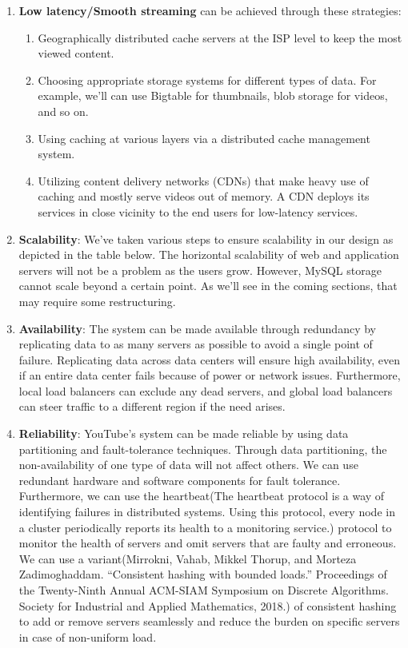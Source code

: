 \begin{enumerate}
\item
\protect{}\label{F2XITvDm3UDQ8Ldcz-ayd}
\textbf{Low latency/Smooth streaming} can be achieved through these strategies:

\begin{enumerate}
\item
Geographically distributed cache servers at the ISP level to keep the most viewed content.
\item
Choosing appropriate storage systems for different types of data. For example, we'll can use Bigtable for thumbnails, blob storage for videos, and so on.
\item
Using caching at various layers via a distributed cache management system.
\item
Utilizing content delivery networks (CDNs) that make heavy use of caching and mostly serve videos out of memory. A CDN deploys its services in close vicinity to the end users for low-latency services.
\end{enumerate}
\item
\protect{}\label{sZtgCym4kSNPRUXife1fA}
\textbf{Scalability}: We've taken various steps to ensure scalability in our design as depicted in the table below. The horizontal scalability of web and application servers will not be a problem as the users grow. However, MySQL storage cannot scale beyond a certain point. As we'll see in the coming sections, that may require some restructuring.
\item
\protect{}\label{LhqJlMDDBff7hNp1W108Z}
\textbf{Availability}: The system can be made available through redundancy by replicating data to as many servers as possible to avoid a single point of failure. Replicating data across data centers will ensure high availability, even if an entire data center fails because of power or network issues. Furthermore, local load balancers can exclude any dead servers, and global load balancers can steer traffic to a different region if the need arises.
\item
\protect{}\label{yeB5U_YNyvNjIwTwkqw4x}
\textbf{Reliability}: YouTube's system can be made reliable by using data partitioning and fault-tolerance techniques. Through data partitioning, the non-availability of one type of data will not affect others. We can use redundant hardware and software components for fault tolerance. Furthermore, we can use the heartbeat(The heartbeat protocol is a way of identifying failures in distributed systems. Using this protocol, every node in a cluster periodically reports its health to a monitoring service.) protocol to monitor the health of servers and omit servers that are faulty and erroneous. We can use a variant(Mirrokni, Vahab, Mikkel Thorup, and Morteza Zadimoghaddam. ``Consistent hashing with bounded loads.'' Proceedings of the Twenty-Ninth Annual ACM-SIAM Symposium on Discrete Algorithms. Society for Industrial and Applied Mathematics, 2018.) of consistent hashing to add or remove servers seamlessly and reduce the burden on specific servers in case of non-uniform load.
\end{enumerate}

